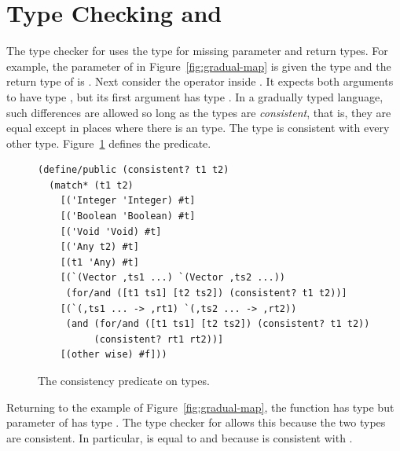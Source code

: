 \documentclass[7x10,nocrop]{TimesAPriori_MIT}%
\begin{document}
\section{Type Checking \LangGrad{} and \LangCast{}}
\label{sec:gradual-type-check}

The type checker for \LangGrad{} uses the  type for missing
parameter and return types. For example, the  parameter of
 in Figure~\ref{fig:gradual-map} is given the type
 and the return type of  is . Next
consider the \code{+} operator inside . It expects both
arguments to have type , but its first argument 
has type .  In a gradually typed language, such differences
are allowed so long as the types are \emph{consistent}, that is, they
are equal except in places where there is an  type. The type
 is consistent with every other type.
Figure~\ref{fig:consistent} defines the  predicate.

\begin{figure}[tbp]
\begin{lstlisting}
(define/public (consistent? t1 t2)
  (match* (t1 t2)
    [('Integer 'Integer) #t]
    [('Boolean 'Boolean) #t]
    [('Void 'Void) #t]
    [('Any t2) #t]
    [(t1 'Any) #t]
    [(`(Vector ,ts1 ...) `(Vector ,ts2 ...))
     (for/and ([t1 ts1] [t2 ts2]) (consistent? t1 t2))]
    [(`(,ts1 ... -> ,rt1) `(,ts2 ... -> ,rt2))
     (and (for/and ([t1 ts1] [t2 ts2]) (consistent? t1 t2))
          (consistent? rt1 rt2))]
    [(other wise) #f]))
\end{lstlisting}
\caption{The consistency predicate on types.}
\label{fig:consistent}
\end{figure}

Returning to the  example of
Figure~\ref{fig:gradual-map}, the  function has type
 but parameter  of  has type
.  The type checker for \LangGrad{} allows this
because the two types are consistent.  In particular, \code{->} is
equal to \code{->} and because  is consistent with
.
\end{document}
